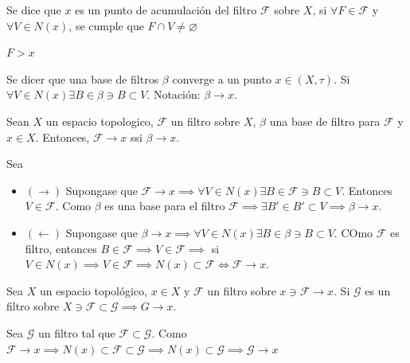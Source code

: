 \begin{definicion}
    Se dice que $x$ es un punto de acumulación del filtro $\mathcal{F}$ sobre $X$, si $\forall F\in \mathcal{F}$ y $\forall V\in N(x)$, se cumple que $F\cap V\neq \varnothing$ 
    \begin{nota}
        $F>x$
    \end{nota}
\end{definicion}

\begin{definicion}
    Se dicer que una base de filtros $\beta$ converge a un punto $x\in (X,\tau)$. Si $\forall V\in N(x)\exists B\in \beta \ni B\subset V$. Notación: $\beta\to x$. 
\end{definicion}

\begin{teorema}
    Sean $X$ un espacio topologico, $\mathcal{F}$ un filtro sobre $X$, $\beta$ una base de filtro para $\mathcal{F}$ y $x\in X$. Entonces, $\mathcal{F}\to x$ ssi $\beta\to x$. 
    \begin{dem}
        Sea 
        \begin{itemize}
            \item $(\to)$ Supongase que $\mathcal{F}\to x\implies \forall V\in N(x)\exists B\in \mathcal{F}\ni B\subset V$. Entonces $V\in \mathcal{F}$. Como $\beta$ es una base para el filtro $\mathcal{F}\implies \exists B'\in B'\subset V\implies \beta \to x$.
            \item $(\gets)$ Supongase que $\beta\to x\implies \forall V\in N(x)\exists B\in \beta \ni B\subset V$. COmo $\mathcal{F}$ es filtro, entonces $B\in \mathcal{F}\implies V\in \mathcal{F}\implies$ si $V\in N(x)\implies V\in \mathcal{F}\implies N(x)\subset \mathcal{F}\iff \mathcal{F}\to x$.
        \end{itemize}
    \end{dem}
\end{teorema}

\begin{prop}
    Sea $X$ un espacio topológico, $x\in X$ y $\mathcal{F}$ un filtro sobre $x\ni \mathcal{F}\to x$. Si $\mathcal{G}$ es un filtro sobre $X\ni \mathcal{F}\subset \mathcal{G}\implies G\to x $.
    \begin{dem}
        Sea $\mathcal{G}$ un filtro tal que $\mathcal{F}\subset \mathcal{G}$. Como $\mathcal{F}\to x\implies N(x)\subset \mathcal{F}\subset \mathcal{G}\implies N(x)\subset  \mathcal{G}\implies  \mathcal{G}\to x$
    \end{dem}
\end{prop}

